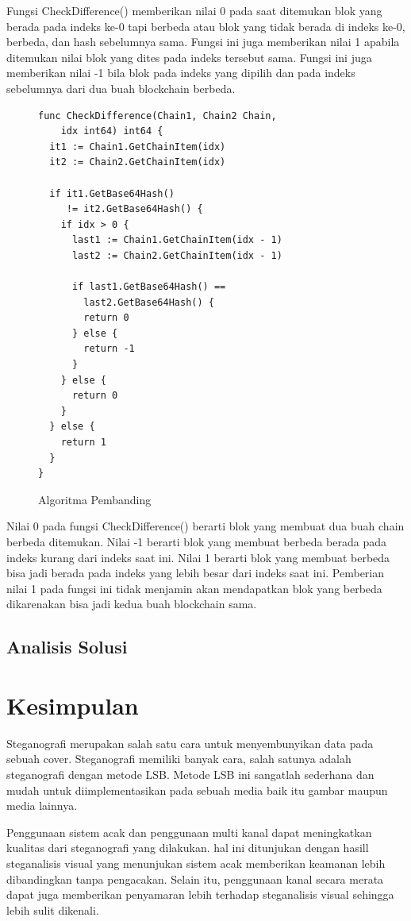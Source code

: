 \documentclass[10pt,conference]{IEEEtran}
\theoremstyle{definition}
\begin{document}
Fungsi CheckDifference() memberikan nilai 0 pada saat ditemukan blok yang berada pada indeks ke-0 tapi berbeda atau blok yang tidak berada di indeks ke-0, berbeda, dan hash sebelumnya sama. Fungsi ini juga memberikan nilai 1 apabila ditemukan nilai blok yang dites pada indeks tersebut sama. Fungsi ini juga memberikan nilai -1 bila blok pada indeks yang dipilih dan pada indeks sebelumnya dari dua buah blockchain berbeda.


\begin{figure}
    \begin{verbatim}
func CheckDifference(Chain1, Chain2 Chain,
    idx int64) int64 {
  it1 := Chain1.GetChainItem(idx)
  it2 := Chain2.GetChainItem(idx)
  
  if it1.GetBase64Hash() 
     != it2.GetBase64Hash() {
    if idx > 0 {
      last1 := Chain1.GetChainItem(idx - 1)
      last2 := Chain2.GetChainItem(idx - 1)
  
      if last1.GetBase64Hash() == 
        last2.GetBase64Hash() {
        return 0
      } else {
        return -1
      }
    } else {
      return 0
    }
  } else {
    return 1
  }
}        
    \end{verbatim}
    \caption{Algoritma Pembanding}
    \label{algo:2} 
\end{figure}

Nilai 0 pada fungsi CheckDifference() berarti blok yang membuat dua buah chain berbeda ditemukan. Nilai -1 berarti blok yang membuat berbeda berada pada indeks kurang dari indeks saat ini. Nilai 1 berarti blok yang  membuat berbeda bisa jadi berada pada indeks yang lebih besar dari indeks saat ini. Pemberian nilai 1 pada fungsi ini tidak menjamin akan mendapatkan blok yang berbeda dikarenakan bisa jadi kedua buah blockchain sama.

\subsection{Analisis Solusi}

\section{Kesimpulan}
Steganografi merupakan salah satu cara untuk menyembunyikan data pada sebuah cover. Steganografi memiliki banyak cara, salah satunya adalah steganografi dengan metode LSB. Metode LSB ini sangatlah sederhana dan mudah
untuk diimplementasikan pada sebuah media baik itu gambar maupun media lainnya. 

Penggunaan sistem acak dan penggunaan multi kanal dapat meningkatkan kualitas dari steganografi yang dilakukan. hal ini ditunjukan dengan hasill steganalisis visual yang menunjukan sistem acak memberikan keamanan lebih
dibandingkan tanpa pengacakan. Selain itu, penggunaan kanal secara merata dapat juga memberikan penyamaran lebih terhadap steganalisis visual sehingga lebih sulit dikenali.
\end{document}
